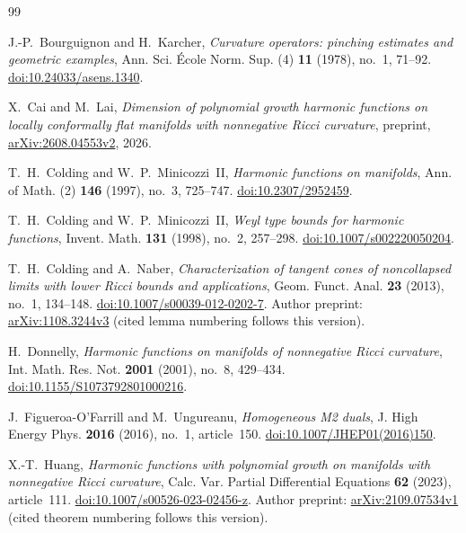 \clearpage
\begin{thebibliography}{99}

J.-P.~Bourguignon and H.~Karcher,
\emph{Curvature operators: pinching estimates and geometric examples},
Ann. Sci. \'Ecole Norm. Sup. (4) \textbf{11} (1978), no.~1, 71--92.
\href{https://doi.org/10.24033/asens.1340}{doi:10.24033/asens.1340}.

X.~Cai and M.~Lai,
\emph{Dimension of polynomial growth harmonic functions on locally
conformally flat manifolds with nonnegative Ricci curvature},
preprint, \href{https://arxiv.org/abs/2608.04553v2}{arXiv:2608.04553v2}, 2026.

T.~H.~Colding and W.~P.~Minicozzi~II,
\emph{Harmonic functions on manifolds},
Ann. of Math. (2) \textbf{146} (1997), no.~3, 725--747.
\href{https://doi.org/10.2307/2952459}{doi:10.2307/2952459}.

T.~H.~Colding and W.~P.~Minicozzi~II,
\emph{Weyl type bounds for harmonic functions},
Invent. Math. \textbf{131} (1998), no.~2, 257--298.
\href{https://doi.org/10.1007/s002220050204}{doi:10.1007/s002220050204}.

T.~H.~Colding and A.~Naber,
\emph{Characterization of tangent cones of noncollapsed limits with lower
Ricci bounds and applications},
Geom. Funct. Anal. \textbf{23} (2013), no.~1, 134--148.
\href{https://doi.org/10.1007/s00039-012-0202-7}{doi:10.1007/s00039-012-0202-7}.
Author preprint: \href{https://arxiv.org/abs/1108.3244v3}{arXiv:1108.3244v3}
(cited lemma numbering follows this version).

H.~Donnelly,
\emph{Harmonic functions on manifolds of nonnegative Ricci curvature},
Int. Math. Res. Not. \textbf{2001} (2001), no.~8, 429--434.
\href{https://doi.org/10.1155/S1073792801000216}{doi:10.1155/S1073792801000216}.

J.~Figueroa-O'Farrill and M.~Ungureanu,
\emph{Homogeneous M2 duals},
J. High Energy Phys. \textbf{2016} (2016), no.~1, article~150.
\href{https://doi.org/10.1007/JHEP01(2016)150}{doi:10.1007/JHEP01(2016)150}.

X.-T.~Huang,
\emph{Harmonic functions with polynomial growth on manifolds with
nonnegative Ricci curvature},
Calc. Var. Partial Differential Equations \textbf{62} (2023),
article~111.
\href{https://doi.org/10.1007/s00526-023-02456-z}{doi:10.1007/s00526-023-02456-z}.
Author preprint: \href{https://arxiv.org/abs/2109.07534v1}{arXiv:2109.07534v1}
(cited theorem numbering follows this version).


\end{thebibliography}
